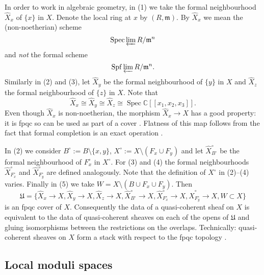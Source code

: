 \documentclass{amsart}
\theoremstyle{definition}
\newcommand{\CC} {\mathbb{C}}          %
\newcommand{\Spec}{\operatorname{Spec}}
\newcommand{\Xhat}{\widehat{X}}
\begin{document}
In order to work in algebraic geometry, in (1) we take the formal neighbourhood $\Xhat _x$ of $\{x\}$ in $X$. Denote the local ring at $x$ by $(R,\mathfrak{m})$. By $\Xhat _x$ we mean the (non-noetherian) scheme
$$
\Spec \varprojlim R / \mathfrak{m}^n 
$$
and \emph{not} the formal scheme $$\mathrm{Spf} \varprojlim R / \mathfrak{m}^n.$$ Similarly in (2) and (3), let $\Xhat _y$ be the formal neighbourhood of $\{y\}$ in $X$ and $\Xhat _z$ the formal neighbourhood of $\{z\}$ in $X$. Note that 
$$
\Xhat _x \cong \Xhat _y \cong \Xhat _z \cong\Spec \CC[\![x_1,x_2,x_3]\!].
$$
Even though $\Xhat _x$ is non-noetherian, the morphism $\Xhat _x \rightarrow X$ has a good property: it is fpqc so can be used as part of a cover \cite[Sect.~2.3.2]{Vis}. Flatness of this map follows from the fact that formal completion is an exact operation \cite[Prop.~10.14]{AM}. 

In (2) we consider $B^\circ := B \setminus \{x,y\}$, $X^\circ := X \setminus (F_x  \cup F_y)$ and let $\Xhat ^{\circ}_{B^\circ}$ be the formal neighbourhood of $F_{x}^{\circ}$ in $X^\circ$. For (3) and (4) the formal neighbourhoods $\Xhat ^{\circ}_{F_{x}^{\circ}}$ and $\Xhat ^{\circ}_{F_{y}^{\circ}}$ are defined analogously. Note that the definition of $X^\circ$ in (2)--(4) varies. Finally in (5) we take $W = X \setminus (B \cup F_x \cup F_y)$. Then
$$
\mathfrak{U} = \{\Xhat _x \rightarrow X, \Xhat _y \rightarrow X, \Xhat _z \rightarrow X, \Xhat ^{\circ}_{B^\circ} \rightarrow X, \Xhat ^{\circ}_{F_{x}^{\circ}} \rightarrow X, \Xhat ^{\circ}_{F_{y}^{\circ}} \rightarrow X, W \subset X\}
$$
is an fpqc cover of $X$. Consequently the data of a quasi-coherent sheaf on $X$ is equivalent to the data of quasi-coherent sheaves on each of the opens of $\mathfrak{U}$ and gluing isomorphisms between the restrictions on the overlaps. Technically: quasi-coherent sheaves on $X$ form a stack with respect to the fpqc topology \cite[Thm.~4.23]{Vis}.


\subsection{Local moduli spaces} \label{localmod}
\end{document}
